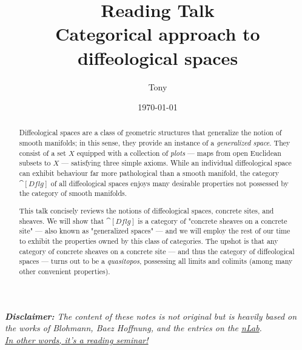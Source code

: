 \documentclass[a4paper,11pt]{article}  %
\title{Reading Talk \\ Categorical approach to diffeological spaces}
\author{Tony}
\date{\today}
\newcommand{\Dflg}{\cat[Dflg]}
\begin{document}

\maketitle
 
\begin{mdframed}[middlelinecolor=red,
middlelinewidth=2pt,
backgroundcolor=red!10,
roundcorner=10pt]
	\textit{\textbf{Disclaimer:} The content of these notes is not original but is heavily based on the works of Blohmann\cite{Blohmann24}, Baez Hoffnung\cite{Baez2011}, and the entries on the \href{https://ncatlab.org/}{\textit{nLab}}. 
	\\
	\underline{In other words, it's a reading seminar!}}
\end{mdframed}



\begin{abstract}
Diffeological spaces are a class of geometric structures that generalize the notion of smooth manifolds; in this sense, they provide an instance of a \emph{generalized space}. They consist of a set $X$ equipped with a collection of \emph{plots} — maps from open Euclidean subsets to $X$ — satisfying three simple axioms. 
While an individual diffeological space can exhibit behaviour far more pathological than a smooth manifold, the category $\Dflg$ of all diffeological spaces enjoys many desirable properties not possessed by the category of smooth manifolds. 

This talk concisely reviews the notions of diffeological spaces, concrete sites, and sheaves. 
We will show that $\Dflg$ is a category of "concrete sheaves on a concrete site" — also known as "generalized spaces" — and we will employ the rest of our time to exhibit the properties owned by this class of categories. 
The upshot is that any category of concrete sheaves on a concrete site — and thus the category of diffeological spaces — turns out to be a \emph{quasitopos}, possessing all limits and colimits (among many other convenient properties).
\end{abstract}
\end{document}
